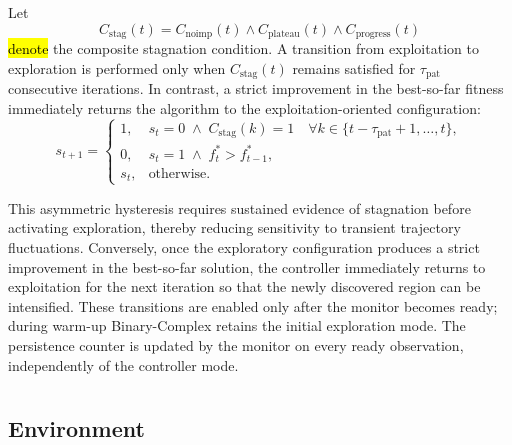 \documentclass[mathematics,article,accept,moreauthors]{Definitions/mdpi}
\begin{document}
Let
\begin{equation}
C_{\mathrm{stag}}(t)
=
C_{\mathrm{noimp}}(t)
\land
C_{\mathrm{plateau}}(t)
\land
C_{\mathrm{progress}}(t)
\label{eq:composite_stagnation}
\end{equation}
\hl{denote} the composite stagnation condition. A transition from exploitation
to exploration is performed only when $C_{\mathrm{stag}}(t)$ remains
satisfied for $\tau_{\mathrm{pat}}$ consecutive iterations. In contrast, a
strict improvement in the best-so-far fitness immediately returns the
algorithm to the exploitation-oriented configuration:
\begin{equation}
s_{t+1} =
\begin{cases}
1,
&
s_t=0
\;\land\;
C_{\mathrm{stag}}(k)=1
\quad
\forall k\in
\{t-\tau_{\mathrm{pat}}+1,\ldots,t\},
\\[2mm]
0,
&
s_t=1
\;\land\;
f_t^*>f_{t-1}^*,
\\[2mm]
s_t,
&
\text{otherwise}.
\end{cases}
\label{eq:binary_complex}
\end{equation}

This asymmetric hysteresis requires sustained evidence of stagnation before
activating exploration, thereby reducing sensitivity to transient trajectory
fluctuations. Conversely, once the exploratory configuration produces a
strict improvement in the best-so-far solution, the controller immediately
returns to exploitation for the next iteration so that the newly
discovered region can be intensified. These transitions are enabled only
after the monitor becomes ready; during warm-up Binary-Complex retains
the initial exploration mode. The persistence counter is updated by the
monitor on every ready observation, independently of the controller mode.



\section{ %
}
\label{sec:experimental_setup}

\subsection{Environment}
\label{sec:computational_environment}
\end{document}
